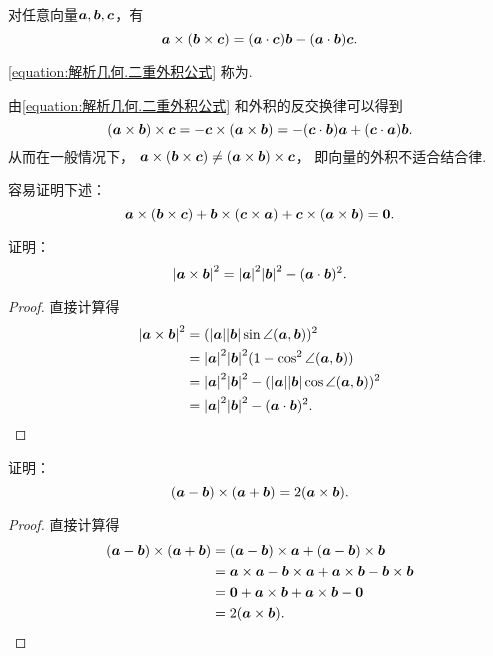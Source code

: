 \begin{theorem}
对任意向量\(\boldsymbol{a},\boldsymbol{b},\boldsymbol{c}\)，有
\begin{equation}\label{equation:解析几何.二重外积公式}
	\boldsymbol{a}\times(\boldsymbol{b}\times\boldsymbol{c})
	= (\boldsymbol{a}\cdot\boldsymbol{c}) \boldsymbol{b}
	- (\boldsymbol{a}\cdot\boldsymbol{b}) \boldsymbol{c}.
\end{equation}
\end{theorem}
\cref{equation:解析几何.二重外积公式}
称为.

由\cref{equation:解析几何.二重外积公式}
和外积的反交换律可以得到\[
	(\boldsymbol{a}\times\boldsymbol{b})\times\boldsymbol{c}
	= -\boldsymbol{c}\times(\boldsymbol{a}\times\boldsymbol{b})
	= -(\boldsymbol{c}\cdot\boldsymbol{b}) \boldsymbol{a}
	+ (\boldsymbol{c}\cdot\boldsymbol{a}) \boldsymbol{b}.
\]
从而在一般情况下，
\(\boldsymbol{a}\times(\boldsymbol{b}\times\boldsymbol{c}) \neq (\boldsymbol{a}\times\boldsymbol{b})\times\boldsymbol{c}\)，
即向量的外积不适合结合律.

容易证明下述：
\begin{equation}\label{equation:解析几何.雅克比等式}
	\boldsymbol{a}\times(\boldsymbol{b}\times\boldsymbol{c})
	+ \boldsymbol{b}\times(\boldsymbol{c}\times\boldsymbol{a})
	+ \boldsymbol{c}\times(\boldsymbol{a}\times\boldsymbol{b})
	= \boldsymbol{0}.
\end{equation}

\begin{example}
证明：\[
	\abs{\boldsymbol{a}\times\boldsymbol{b}}^2
	= \abs{\boldsymbol{a}}^2 \abs{\boldsymbol{b}}^2 - (\boldsymbol{a}\cdot\boldsymbol{b})^2.
\]
\begin{proof}
\def\t{\angle(\vb{a},\vb{b})}%
直接计算得\begin{align*}
	\abs{\vb{a}\times\vb{b}}^2
	&= (\abs{\vb{a}}\abs{\vb{b}}\sin\t)^2 \\
	&= \abs{\vb{a}}^2 \abs{\vb{b}}^2 (1-\cos^2\t) \\
	&= \abs{\vb{a}}^2 \abs{\vb{b}}^2
	- (\abs{\vb{a}}\abs{\vb{b}}\cos\t)^2 \\
	&= \abs{\vb{a}}^2 \abs{\vb{b}}^2
	- (\vb{a}\cdot\vb{b})^2.
	\qedhere
\end{align*}
\end{proof}
\end{example}

\begin{example}
证明：\[
	(\boldsymbol{a}-\boldsymbol{b})\times(\boldsymbol{a}+\boldsymbol{b})
	= 2(\boldsymbol{a}\times\boldsymbol{b}).
\]
\begin{proof}
直接计算得\begin{align*}
	(\boldsymbol{a}-\boldsymbol{b})\times(\boldsymbol{a}+\boldsymbol{b})
	&= (\boldsymbol{a}-\boldsymbol{b})\times\boldsymbol{a}
	+ (\boldsymbol{a}-\boldsymbol{b})\times\boldsymbol{b} \\
	&= \boldsymbol{a}\times\boldsymbol{a}-\boldsymbol{b}\times\boldsymbol{a}
	+ \boldsymbol{a}\times\boldsymbol{b}-\boldsymbol{b}\times\boldsymbol{b} \\
	&= \boldsymbol{0}+\boldsymbol{a}\times\boldsymbol{b}
	+ \boldsymbol{a}\times\boldsymbol{b}-\boldsymbol{0} \\
	&= 2(\boldsymbol{a}\times\boldsymbol{b}).
	\qedhere
\end{align*}
\end{proof}
\end{example}

